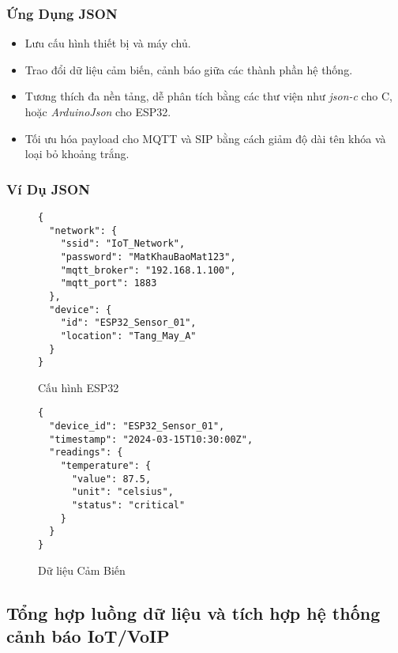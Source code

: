 \subsubsection{Ứng Dụng JSON}
\label{subsubsec:json_applications}

\begin{itemize}
\item Lưu cấu hình thiết bị và máy chủ.
\item Trao đổi dữ liệu cảm biến, cảnh báo giữa các thành phần hệ thống.
\item Tương thích đa nền tảng, dễ phân tích bằng các thư viện như \textit{json-c} cho C, hoặc \textit{ArduinoJson} cho ESP32.
\item Tối ưu hóa payload cho MQTT và SIP bằng cách giảm độ dài tên khóa và loại bỏ khoảng trắng.
\end{itemize}

\subsubsection{Ví Dụ JSON}
\label{subsubsec:json_examples}

\begin{figure}[H]
\centering
\begin{verbatim}
{
  "network": {
    "ssid": "IoT_Network",
    "password": "MatKhauBaoMat123",
    "mqtt_broker": "192.168.1.100",
    "mqtt_port": 1883
  },
  "device": {
    "id": "ESP32_Sensor_01",
    "location": "Tang_May_A"
  }
}
\end{verbatim}
\caption{Cấu hình ESP32}
\label{fig:json_esp32_config}
\end{figure}

\begin{figure}[H]
\centering
\begin{verbatim}
{
  "device_id": "ESP32_Sensor_01",
  "timestamp": "2024-03-15T10:30:00Z",
  "readings": {
    "temperature": {
      "value": 87.5,
      "unit": "celsius",
      "status": "critical"
    }
  }
}
\end{verbatim}
\caption{Dữ liệu Cảm Biến}
\label{fig:json_sensor_data}
\end{figure}

\subsection{Tổng hợp luồng dữ liệu và tích hợp hệ thống cảnh báo IoT/VoIP}
\label{subsec:system_integration}

